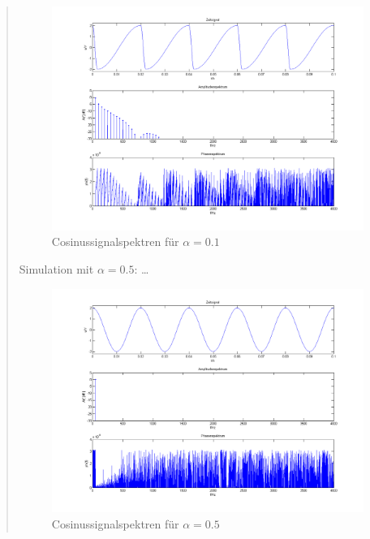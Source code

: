 \begin{quote}
\begin{center}
	           \begin{figure}[H]
    			\centering
    				\includegraphics[scale=0.5]{cos_alpha1.png}
    				\caption{Cosinussignalspektren für $\alpha = 0.1$}
    			\end{figure}	
    			\caption{}	
		
		\end{center}
		
		\vspace{1em}
		
		Simulation mit $\alpha = 0.5$: \ldots
		
		\begin{center}
	    
	           \begin{figure}[H]
    			\centering
    				\includegraphics[scale=0.5]{cos_alpha5.png}
    			\caption{Cosinussignalspektren für $\alpha = 0.5$}
    			\end{figure}		
		

\end{center}
\end{quote}

